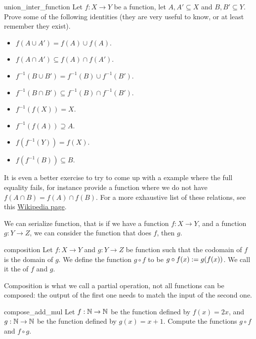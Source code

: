 \begin{cex}{}{union_inter_function}
    Let \( f : X \to Y \) be a function, let \( A, A' \subseteq X \) and \( B, B' \subseteq Y \). Prove some of the following identities (they are very useful to know, or at least remember they exist).
    \begin{itemize}
        \item \( f(A \cup A') = f(A) \cup f(A) \).
        \item \( f(A \cap A') \subseteq f(A) \cap f(A') \).
        \item \( f^{-1}(B \cup B') = f^{-1}(B) \cup f^{-1}(B') \).
        \item \( f^{-1}(B \cap B') \subseteq f^{-1}(B) \cap f^{-1}(B') \).
        \item \( f^{-1}(f(X)) = X \).
        \item \( f^{-1}(f(A)) \supseteq A \).
        \item \( f(f^{-1}(Y)) = f(X) \).
        \item \( f(f^{-1}(B)) \subseteq B \).
    \end{itemize}
    It is even a better exercise to try to come up with a example where the full equality fails, for instance provide a function where we do not have \( f(A \cap B) = f(A) \cap f(B) \). For a more exhaustive list of these relations, see this \href{https://en.wikipedia.org/wiki/Image_(mathematics)}{Wikipedia page}.
\end{cex}

We can serialize function, that is if we have a function \( f : X \to Y \), and a function \( g : Y \to Z \), we can consider the function that does \( f \), then \( g \). 

\begin{cdef}{}{composition}
    Let \( f : X \to Y \) and \( g : Y \to Z \) be function such that the codomain of \( f \) is the domain of \( g \). We define the function \( g \circ f \) to be \( g \circ f (x) := g(f(x)) \). We call it the  of \( f \) and \( g \).
\end{cdef}

Composition is what we call a partial operation, not all functions can be composed: the output of the first one needs to match the input of the second one. 
\begin{cexp}{}{compose_add_mul}
    Let \( f : \mathbb{N} \to \mathbb{N} \) be the function defined by \( f(x) = 2x \), and \( g : \mathbb{N} \to \mathbb{N} \) be the function defined by \( g(x) = x + 1 \). Compute the functions \( g \circ f \) and \( f \circ g \).
\end{cexp} 

